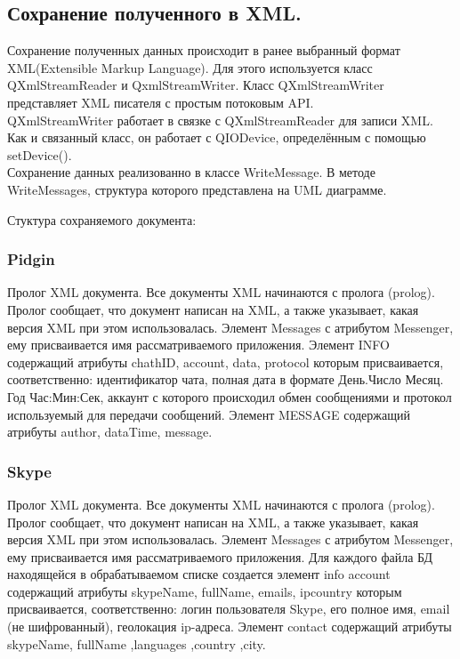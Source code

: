 {{{{{{\subsection{Сохранение полученного в XML.}

Сохранение полученных данных происходит в ранее выбранный формат XML(Extensible Markup Language). Для этого используется класс QXmlStreamReader и QxmlStreamWriter.
Класс QXmlStreamWriter представляет XML писателя с простым потоковым API.\\

QXmlStreamWriter работает в связке с QXmlStreamReader для записи XML. Как и связанный класс, он работает с QIODevice, определённым с помощью setDevice().\\

Сохранение данных реализованно в классе WriteMessage. В методе WriteMessages, структура которого представлена на UML диаграмме. %

Стуктура сохраняемого документа:
\subsubsection{Pidgin}
  Пролог XML документа. Все документы XML начинаются с пролога (prolog). Пролог сообщает, что документ написан на XML, а также указывает, какая версия XML при этом использовалась.  
  Элемент Messages с атрибутом Messenger, ему присваивается имя рассматриваемого приложения.
  Элемент INFO содержащий атрибуты chathID, account, data, protocol которым присваивается, соответственно: идентификатор чата, полная дата в формате  День.Число Месяц. Год Час:Мин:Сек, аккаунт с которого происходил обмен сообщениями и протокол используемый для передачи сообщений. 
  Элемент MESSAGE содержащий атрибуты author, dataTime, message.
\subsubsection{Skype}
  Пролог XML документа. Все документы XML начинаются с пролога (prolog). Пролог сообщает, что документ написан на XML, а также указывает, какая версия XML при этом использовалась.  
  Элемент Messages с атрибутом Messenger, ему присваивается имя рассматриваемого приложения.
  Для каждого файла БД находящейся в обрабатываемом списке создается элемент info account содержащий атрибуты skypeName, fullName, emails, ipcountry которым присваивается, соответственно: логин пользователя Skype, его полное имя, email (не шифрованный), геолокация ip-адреса.  
  Элемент contact содержащий атрибуты skypeName, fullName ,languages ,country ,city.
  
}}}}}}
